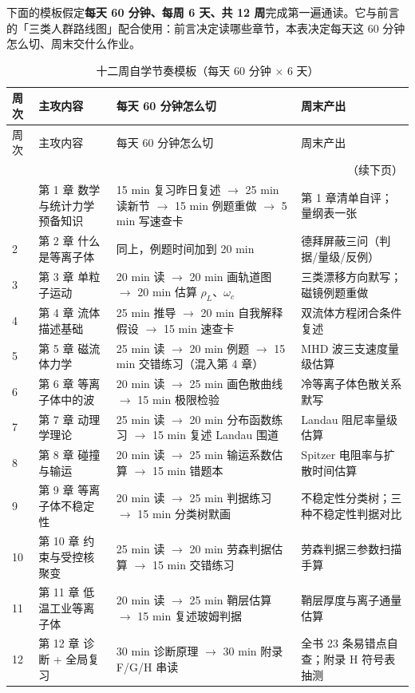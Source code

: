 下面的模板假定\textbf{每天 60 分钟、每周 6 天、共 12 周}完成第一遍通读。它与前言的「三类人群路线图」配合使用：前言决定读哪些章节，本表决定每天这 60 分钟怎么切、周末交什么作业。

\small
\begin{longtable}{@{}p{0.9cm}p{3.1cm}p{6.8cm}p{3.8cm}@{}}
\caption{十二周自学节奏模板（每天 60 分钟 $\times$ 6 天）}\label{tab:app-i-12weeks}\\
\toprule
周次 & 主攻内容 & 每天 60 分钟怎么切 & 周末产出 \\
\midrule
\endfirsthead
\toprule
周次 & 主攻内容 & 每天 60 分钟怎么切 & 周末产出 \\
\midrule
\endhead
\midrule
\multicolumn{4}{r}{\small（续下页）}\\
\endfoot
\bottomrule
\endlastfoot
1 & 第 1 章 数学与统计力学预备知识 & 15 min 复习昨日复述 $\to$ 25 min 读新节 $\to$ 15 min 例题重做 $\to$ 5 min 写速查卡 & 第 1 章清单自评；量纲表一张 \\
2 & 第 2 章 什么是等离子体 & 同上，例题时间加到 20 min & 德拜屏蔽三问（判据/量级/反例） \\
3 & 第 3 章 单粒子运动 & 20 min 读 $\to$ 20 min 画轨道图 $\to$ 20 min 估算 $\rho_L$、$\omega_c$ & 三类漂移方向默写；磁镜例题重做 \\
4 & 第 4 章 流体描述基础 & 25 min 推导 $\to$ 20 min 自我解释假设 $\to$ 15 min 速查卡 & 双流体方程闭合条件复述 \\
5 & 第 5 章 磁流体力学 & 25 min 读 $\to$ 20 min 例题 $\to$ 15 min 交错练习（混入第 4 章） & MHD 波三支速度量级估算 \\
6 & 第 6 章 等离子体中的波 & 20 min 读 $\to$ 25 min 画色散曲线 $\to$ 15 min 极限检验 & 冷等离子体色散关系默写 \\
7 & 第 7 章 动理学理论 & 25 min 读 $\to$ 20 min 分布函数练习 $\to$ 15 min 复述 Landau 围道 & Landau 阻尼率量级估算 \\
8 & 第 8 章 碰撞与输运 & 20 min 读 $\to$ 25 min 输运系数估算 $\to$ 15 min 错题本 & Spitzer 电阻率与扩散时间估算 \\
9 & 第 9 章 等离子体不稳定性 & 20 min 读 $\to$ 25 min 判据练习 $\to$ 15 min 分类树默画 & 不稳定性分类树；三种不稳定性判据对比 \\
10 & 第 10 章 约束与受控核聚变 & 25 min 读 $\to$ 20 min 劳森判据估算 $\to$ 15 min 交错练习 & 劳森判据三参数扫描手算 \\
11 & 第 11 章 低温工业等离子体 & 20 min 读 $\to$ 25 min 鞘层估算 $\to$ 15 min 复述玻姆判据 & 鞘层厚度与离子通量估算 \\
12 & 第 12 章 诊断 + 全局复习 & 30 min 诊断原理 $\to$ 30 min 附录 F/G/H 串读 & 全书 23 条易错点自查；附录 H 符号表抽测 \\
\end{longtable}
\normalsize


